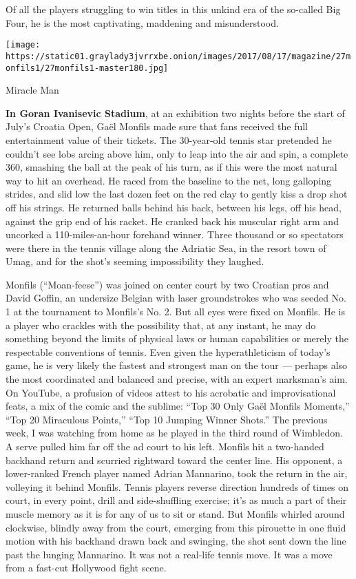 Of all the players struggling to win titles in this unkind era of the
so-called Big Four, he is the most captivating, maddening and
misunderstood.

\texttt{[image: https://static01.graylady3jvrrxbe.onion/images/2017/08/17/magazine/27monfils1/27monfils1-master180.jpg]}

Miracle Man

\textbf{In Goran Ivanisevic Stadium}, at an exhibition two nights before
the start of July's Croatia Open, Gaël Monfils made sure that fans
received the full entertainment value of their tickets. The 30-year-old
tennis star pretended he couldn't see lobs arcing above him, only to
leap into the air and spin, a complete 360, smashing the ball at the
peak of his turn, as if this were the most natural way to hit an
overhead. He raced from the baseline to the net, long galloping strides,
and slid low the last dozen feet on the red clay to gently kiss a drop
shot off his strings. He returned balls behind his back, between his
legs, off his head, against the grip end of his racket. He cranked back
his muscular right arm and uncorked a 110-miles-an-hour forehand winner.
Three thousand or so spectators were there in the tennis village along
the Adriatic Sea, in the resort town of Umag, and for the shot's seeming
impossibility they laughed.

Monfils (``Moan-feese'') was joined on center court by two Croatian pros
and David Goffin, an undersize Belgian with laser groundstrokes who was
seeded No. 1 at the tournament to Monfils's No. 2. But all eyes were
fixed on Monfils. He is a player who crackles with the possibility that,
at any instant, he may do something beyond the limits of physical laws
or human capabilities or merely the respectable conventions of tennis.
Even given the hyperathleticism of today's game, he is very likely the
fastest and strongest man on the tour --- perhaps also the most
coordinated and balanced and precise, with an expert marksman's aim. On
YouTube, a profusion of videos attest to his acrobatic and
improvisational feats, a mix of the comic and the sublime: ``Top 30 Only
Gaël Monfils Moments,'' ``Top 20 Miraculous Points,'' ``Top 10 Jumping
Winner Shots.'' The previous week, I was watching from home as he played
in the third round of Wimbledon. A serve pulled him far off the ad court
to his left. Monfils hit a two-handed backhand return and scurried
rightward toward the center line. His opponent, a lower-ranked French
player named Adrian Mannarino, took the return in the air, volleying it
behind Monfils. Tennis players reverse direction hundreds of times on
court, in every point, drill and side-shuffling exercise; it's as much a
part of their muscle memory as it is for any of us to sit or stand. But
Monfils whirled around clockwise, blindly away from the court, emerging
from this pirouette in one fluid motion with his backhand drawn back and
swinging, the shot sent down the line past the lunging Mannarino. It was
not a real-life tennis move. It was a move from a fast-cut Hollywood
fight scene.

